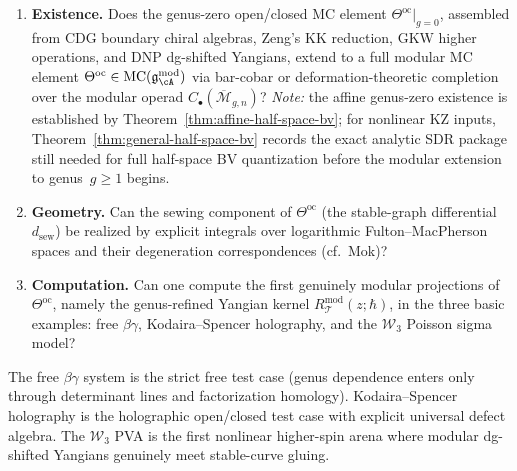 \begin{enumerate}[label=\textup{(\roman*)}]
\item \textbf{Existence.}
 \ClaimStatusConjectured{}
 Does the genus-zero open/closed MC element
 $\Theta^{\mathrm{oc}}|_{g=0}$, assembled from CDG
 boundary chiral algebras, Zeng's KK reduction, GKW higher operations,
 and DNP dg-shifted Yangians, extend to a full modular MC element
 $\Theta^{\mathrm{oc}} \in \mathrm{MC}(\mathfrak{g}^{\mathrm{mod}}_\cA)$
 via bar-cobar or deformation-theoretic completion over the modular
 operad $C_\bullet(\overline{\mathcal{M}}_{g,n})$?
 \emph{Note:} the affine genus-zero existence is established by
 Theorem~\ref{thm:affine-half-space-bv}; for nonlinear KZ inputs,
 Theorem~\ref{thm:general-half-space-bv} records the exact analytic
 SDR package still needed for full half-space BV quantization before
 the modular extension to genus~$g \ge 1$ begins.

\item \textbf{Geometry.}
 \ClaimStatusConjectured{}
 Can the sewing component of $\Theta^{\mathrm{oc}}$ (the
 stable-graph differential $d_{\mathrm{sew}}$) be realized by
 explicit integrals over
 logarithmic Fulton--MacPherson spaces and their degeneration
 correspondences (cf.\ Mok)?

\item \textbf{Computation.}
 \ClaimStatusConjectured{}
 Can one compute the first genuinely modular projections of
 $\Theta^{\mathrm{oc}}$, namely the
 genus-refined Yangian kernel
 $R_{\mathcal{T}}^{\mathrm{mod}}(z;\hbar)$, in the three basic
 examples: free $\beta\gamma$, Kodaira--Spencer holography, and the
 $\mathcal{W}_3$ Poisson sigma model?
\end{enumerate}

\noindent
The free $\beta\gamma$ system is the strict free test case (genus
dependence enters only through determinant lines and factorization
homology). Kodaira--Spencer holography is the holographic open/closed
test case with explicit universal defect algebra. The $\mathcal{W}_3$
PVA is the first nonlinear higher-spin arena where modular dg-shifted
Yangians genuinely meet stable-curve gluing.

